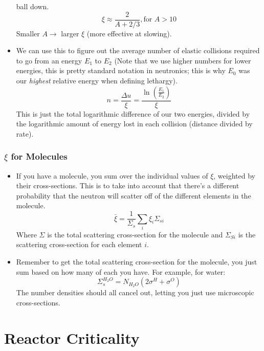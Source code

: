 \documentclass[letter]{article}
\begin{document}
\begin{itemize}
  ball down.
  \begin{equation*}
    \xi \approx \frac{2}{A+2/3}, \text{for } A>10
  \end{equation*}
Smaller $A \to$ larger $\xi$ (more effective at slowing). \cite[Lec. 9]{lecture}
\item We can use this to figure out the average number of elastic collisions
  required to go from an energy $E_1$ to $E_2$ (Note that we use
  higher numbers for lower energies, this is pretty standard notation
  in neutronics; this is why $E_0$ was our \textit{highest} relative
  energy when defining lethargy).
  \begin{equation*}
    n=\frac{\Delta{}u}{\xi}=\frac{\ln\left(\frac{E_1}{E_2}\right)}{\xi}
  \end{equation*}
  This is just the total logarithmic difference of our two energies,
  divided by the logarithmic amount of energy lost in each collision
  (distance divided by rate).\cite[Lec. 9]{lecture}
\end{itemize}

\subsubsection{$\xi$ for Molecules}
\begin{itemize}
\item If you have a molecule, you sum over the individual values of
  $\xi$, weighted by their cross-sections. This is to take into account
  that there's a different probability that the neutron will scatter
  off of the different elements in the molecule.
  \begin{equation*}
    \bar{\xi}=\frac{1}{\Sigma_s}\sum_i\xi_i\Sigma_{si}
  \end{equation*}
Where $\Sigma$ is the total scattering cross-section for the molecule
and $\Sigma_{Si}$ is the scattering cross-section for each element
$i$.\cite[Lec. 9]{lecture}
\item Remember to get the total scattering cross-section for the
  molecule, you just sum based on how many of each you have. For
  example, for water:
  \begin{equation*}
    \Sigma^{H_2O}_s=N_{H_2O}(2\sigma^H+\sigma^O)
  \end{equation*}
The number densities should all cancel out, letting you just use
microscopic cross-sections.
\end{itemize}

\section{Reactor Criticality}
\end{document}
